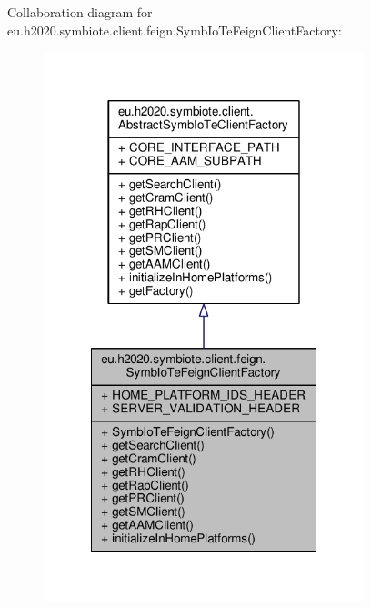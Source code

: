 Collaboration diagram for eu.\+h2020.\+symbiote.\+client.\+feign.\+Symb\+Io\+Te\+Feign\+Client\+Factory\+:
\nopagebreak
\begin{figure}[H]
\begin{center}
\leavevmode
\includegraphics[width=264pt]{classeu_1_1h2020_1_1symbiote_1_1client_1_1feign_1_1SymbIoTeFeignClientFactory__coll__graph}
\end{center}
\end{figure}

